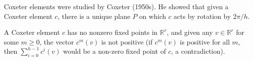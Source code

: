 Coxeter elements were studied by Coxeter (1950s). He showed that given a
Coxeter element $c$, there is a unique plane $P$ on which $c$ acts by
rotation by $2\pi/h$.

A Coxeter element $c$ has no nonzero fixed points in $\mathbb{R}^r$, and given
any $v \in \mathbb{R}^r$ for some $m\geq 0$, the vector $c^m(v)$ is not
positive (if $c^m(v)$ is positive for all $m$, then $\sum_{i = 0}^{h-1} c^i(v)$
would be a non-zero fixed point of $c$, a contradiction).
